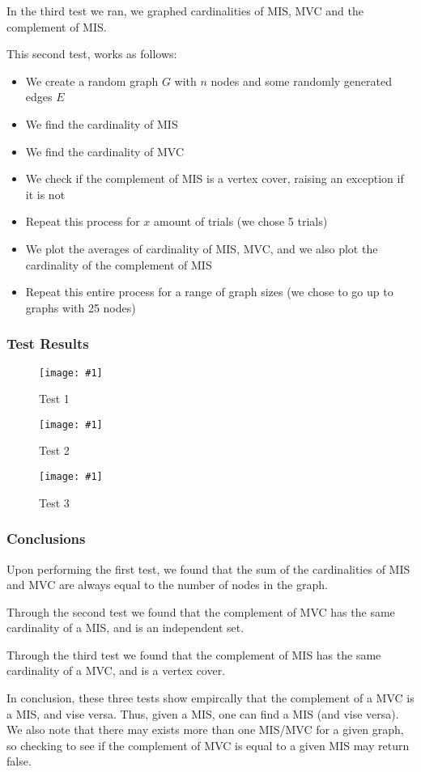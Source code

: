 \documentclass[12pt]{article}
\newcommand{\firgureBuffered}[2]
{
    \begin{figure}[ht!]
        \centering
        \texttt{[image: \#1]}
        \caption{#2}
    \end{figure}
}
\begin{document}
In the third test we ran, we graphed cardinalities of MIS, MVC and the complement of MIS.

This second test, works as follows:

\begin{itemize}
    \item We create a random graph $G$ with $n$ nodes and some randomly generated edges $E$
    \item We find the cardinality of MIS
    \item We find the cardinality of MVC
    \item We check if the complement of MIS is a vertex cover, raising an exception if it is not
    \item Repeat this process for $x$ amount of trials (we chose 5 trials)
    \item We plot the averages of cardinality of MIS, MVC, and we also plot the cardinality of the complement of MIS
    \item Repeat this entire process for a range of graph sizes (we chose to go up to graphs with 25 nodes)
\end{itemize}


\subsubsection{Test Results}

\FloatBarrier{}
\firgureBuffered{images/IndSet/Figure_1.png}{Test 1}
\firgureBuffered{images/IndSet/Figure_2.png}{Test 2}
\firgureBuffered{images/IndSet/Figure_3.png}{Test 3}
\FloatBarrier{}

\subsubsection{Conclusions}
Upon performing the first test, we found that the sum of the cardinalities of MIS and MVC are always equal
to the number of nodes in the graph. 

Through the second test we found that the complement of MVC has the same cardinality of a MIS, and is an independent set.

Through the third test we found that the complement of MIS has the same cardinality of a MVC, and is a vertex cover.

In conclusion, these three tests show empircally that the complement of a MVC is a MIS, and vise versa. Thus, given a MIS, 
one can find a MIS (and vise versa). We also note that there may exists more than one MIS/MVC for a given graph, so checking 
to see if the complement of MVC is equal to a given MIS may return false. 
\end{document}
